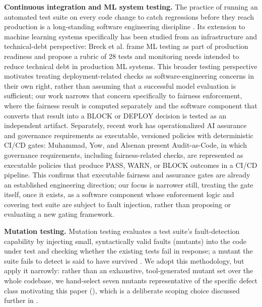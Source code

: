 \documentclass[]{einformatica}
\begin{document}
\textbf{Continuous integration and ML system testing.} The practice of running an automated test suite on every code change to catch regressions before they reach production is a long-standing software engineering discipline \cite{Fowler2006}. Its extension to machine learning systems specifically has been studied from an infrastructure and technical-debt perspective: Breck et al. \cite{Breck2017} frame ML testing as part of production readiness and propose a rubric of 28 tests and monitoring needs intended to reduce technical debt in production ML systems. This broader testing perspective motivates treating deployment-related checks as software-engineering concerns in their own right, rather than assuming that a successful model evaluation is sufficient; our work narrows that concern specifically to fairness enforcement, where the fairness result is computed separately and the software component that converts that result into a BLOCK or DEPLOY decision is tested as an independent artifact. Separately, recent work has operationalized AI assurance and governance requirements as executable, versioned policies with deterministic CI/CD gates: Muhammad, Yow, and Alsenan \cite{Muhammad2026} present Audit-as-Code, in which governance requirements, including fairness-related checks, are represented as executable policies that produce PASS, WARN, or BLOCK outcomes in a CI/CD pipeline. This confirms that executable fairness and assurance gates are already an established engineering direction; our focus is narrower still, treating the gate itself, once it exists, as a software component whose enforcement logic and covering test suite are subject to fault injection, rather than proposing or evaluating a new gating framework.

\textbf{Mutation testing.} Mutation testing evaluates a test suite's fault-detection capability by injecting small, syntactically valid faults (mutants) into the code under test and checking whether the existing tests fail in response; a mutant the suite fails to detect is said to have survived \cite{Jia2011}. We adopt this methodology, but apply it narrowly: rather than an exhaustive, tool-generated mutant set over the whole codebase, we hand-select seven mutants representative of the specific defect class motivating this paper (), which is a deliberate scoping choice discussed further in .
\end{document}
